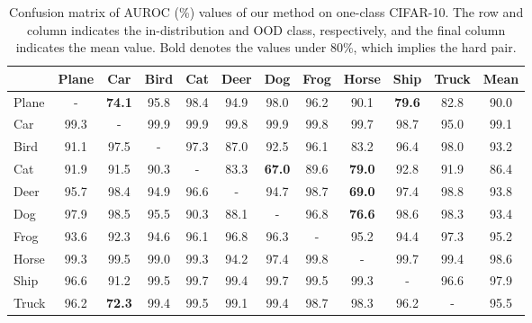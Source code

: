 \documentclass{article}
\begin{document}
\begin{table}[h]
\vspace{-0.05in}
\centering\small
\caption{
Confusion matrix of AUROC (\%) values of our method on one-class CIFAR-10. The row and column indicates the in-distribution and OOD class, respectively, and the final column indicates the mean value. Bold denotes the values under 80\%, which implies the hard pair.
}\label{tab:oc-confusion}
\begin{tabular}{lcccccccccc|c}
\toprule
& Plane & Car & Bird & Cat & Deer & Dog & Frog & Horse & Ship & Truck & Mean \\
\midrule
Plane & - & \textbf{74.1} & 95.8 & 98.4 & 94.9 & 98.0 & 96.2 & 90.1 & \textbf{79.6} & 82.8 & 90.0 \\
Car   & 99.3 & - & 99.9 & 99.9 & 99.8 & 99.9 & 99.8 & 99.7 & 98.7 & 95.0 & 99.1 \\
Bird  & 91.1 & 97.5 & - & 97.3 & 87.0 & 92.5 & 96.1 & 83.2 & 96.4 & 98.0 & 93.2 \\
Cat   & 91.9 & 91.5 & 90.3 & - & 83.3 & \textbf{67.0} & 89.6 & \textbf{79.0} & 92.8 & 91.9 & 86.4 \\
Deer  & 95.7 & 98.4 & 94.9 & 96.6 & - & 94.7 & 98.7 & \textbf{69.0} & 97.4 & 98.8 & 93.8 \\
Dog   & 97.9 & 98.5 & 95.5 & 90.3 & 88.1 & - & 96.8 & \textbf{76.6} & 98.6 & 98.3 & 93.4 \\
Frog  & 93.6 & 92.3 & 94.6 & 96.1 & 96.8 & 96.3 & - & 95.2 & 94.4 & 97.3 & 95.2 \\
Horse & 99.3 & 99.5 & 99.0 & 99.3 & 94.2 & 97.4 & 99.8 & - & 99.7 & 99.4 & 98.6 \\
Ship  & 96.6 & 91.2 & 99.5 & 99.7 & 99.4 & 99.7 & 99.5 & 99.3 & - & 96.6 & 97.9 \\
Truck & 96.2 & \textbf{72.3} & 99.4 & 99.5 & 99.1 & 99.4 & 98.7 & 98.3 & 96.2 & - & 95.5 \\
\bottomrule
\end{tabular}
\end{table} \begin{table*}[h]
\vspace{-0.05in}
\centering\small
\caption{
AUROC (\%) values of various OOD detection methods trained on one-class CIFAR-100 (super-class). Each row indicates the results of the selected super-class, and the final row indicates the mean value.  denotes the values from the reference, and bold denotes the best results.
}\label{tab:oc-cifar100-full}
\vspace{-0.1in}
\end{table*}
\end{document}

